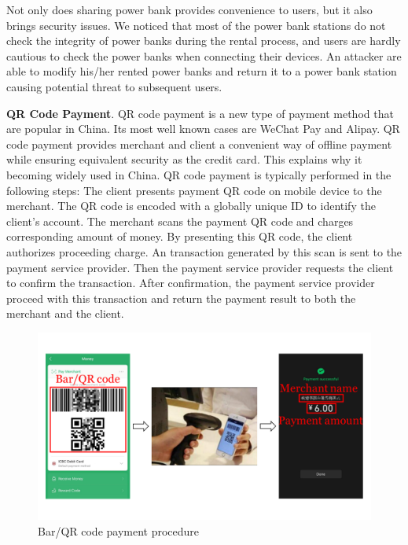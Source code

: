 

Not only does sharing power bank provides convenience to users, but it also brings security issues. 
We noticed that most of the power bank stations do not check the integrity of power banks during the rental process, and users are hardly cautious to check the power banks when connecting their devices. 
An attacker are able to modify his/her rented power banks and return it to a power bank station causing potential threat to subsequent users.


\textbf{QR Code Payment}. 
QR code payment is a new type of payment method that are popular in China. Its most well known cases are WeChat Pay and Alipay. QR code payment provides merchant and client a convenient way of offline payment while ensuring equivalent security as the credit card. This explains why it becoming widely used in China.
QR code payment is typically performed in the following steps:
 The client presents payment QR code on mobile device to the merchant. 
The QR code is encoded with a globally unique ID to identify the client's account. 
 The merchant scans the payment QR code and charges corresponding amount of money. 
By presenting this QR code, the client authorizes proceeding charge.
 An transaction generated by this scan is sent to the payment service provider. 
Then the payment service provider requests the client to confirm the transaction.
 After confirmation, the payment service provider proceed with this transaction and return the payment result to both the merchant and the client.

\begin{figure}[t]
	\centering
	\includegraphics[width=\linewidth]{./Figs/qr_code_payment.png}
	\caption{Bar/QR code payment procedure}
	\label{fig:qr_payment_procedure}
\end{figure}


